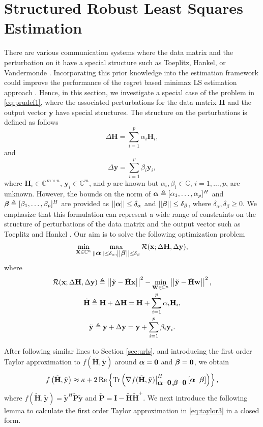 \documentclass[review,sort&compress]{elsarticle}
\renewcommand{\vec}[1]{\mbox{$\mathbf{#1}$}}
\newcommand{\norm}[1]{\left|\left|#1\right|\right|}
\newcommand{\defi}{\triangleq}
\newcommand{\tr}{\mathrm{Tr}}
\newcommand{\C}{\mathbb{C}}
\newcommand{\R}{{\cal R}}
\newcommand{\vH}{\vec{H}}
\newcommand{\vx}{\vec{x}}
\newcommand{\vy}{\vec{y}}
\newcommand{\dH}{\Delta\vH}
\newcommand{\dy}{\Delta\vy}
\newcommand{\tH}{\tilde{\vec{H}}}
\newcommand{\ty}{\tilde{\vec{y}}}
\newcommand{\tP}{\tilde{\vec{P}}}
\newcommand{\vI}{\vec{I}}
\newcommand{\vw}{\vec{w}}
\newcommand{\va}{\mbox{\boldmath$\alpha$}}
\newcommand{\vbet}{\mbox{\boldmath$\beta$}}
\begin{document}
\section{Structured Robust Least Squares Estimation}\label{sec:srls}
There are various communication systems where the data matrix and the perturbation on it have a special structure such as Toeplitz, Hankel, or Vandermonde \cite{est1, tls}. Incorporating this prior knowledge into the estimation framework could improve the performance of the regret based minimax LS estimation approach \cite{est1, tls}. Hence, in this section, we investigate a special case of the problem in \eqref{eq:prudef1}, where the associated perturbations for the data matrix $\vH$ and the output vector $\vy$ have special structures. The structure on the perturbations is defined as follows
\begin{equation}\label{eq:dH}
  \dH = \sum_{i=1}^p\alpha_i\vH_i,
\end{equation}
and
\begin{equation}\label{eq:dy}
  \dy = \sum_{i=1}^p\beta_i\vy_i,
\end{equation}
where $\vH_i \in \C^{m \times n}$, $\vy_i \in \C^m$, and $p$ are known but $\alpha_i,\beta_i \in \C$, $i=1,\dots,p$, are unknown. However, the bounds on the norm of $\va \defi [\alpha_1,\dots,\alpha_p]^H$ and $\vbet \defi [\beta_1,\dots,\beta_p]^H$ are provided as $\norm{\va} \leq \delta_{\alpha}$ and $\norm{\vbet} \leq \delta_{\beta}$, where $\delta_{\alpha}, \delta_{\beta} \geq 0$. We emphasize that this formulation can represent a wide range of constraints on the structure of perturbations of the data matrix and the output vector such as Toeplitz and Hankel \cite{est1, sayedbook}. Our aim is to solve the following optimization problem
\[
\min_{\vx \in \C^n} \max_{\norm{\va} \leq \delta_{\alpha}, \norm{\vbet} \leq \delta_{\beta}} \R(\vx; \dH, \dy),
\]
where
\begin{gather}
  \R(\vx; \dH, \dy) \defi \norm{\ty - \tH \vx}^2 - \min_{\vw \in \C^n} \norm{\ty - \tH \vw}^2, \label{eq:regret_first_3}\\
  \tH \defi \vH + \dH = \vH + \sum_{i=1}^p \alpha_i \vH_i, \label{eq:tH}\\
  \ty \defi \vy + \dy = \vy + \sum_{i=1}^p \beta_i \vy_i. \label{eq:ty}
\end{gather}

After following similar lines to Section \ref{sec:urls}, and introducing the first order Taylor approximation to $f\left(\tH,\ty\right)$ around $\va = \vec{0}$ and $\vbet = \vec{0}$, we obtain
\begin{equation}\label{eq:taylor3}
  f\left(\tH,\ty\right) \approx \kappa + 2\operatorname{Re} \left\{ \tr\left( \nabla f(\tH, \ty)\big\vert_{\va=\vec{0}, \vbet=\vec{0}}^H \left[\va \;\; \vbet\right] \right) \right\},
\end{equation}
where $f\left(\tH,\ty\right) = \ty^H \tP \ty$ and $\tP = \vI - \tH \tH^+$. We next introduce the following lemma to calculate the first order Taylor approximation in \eqref{eq:taylor3} in a closed form.
\end{document}
